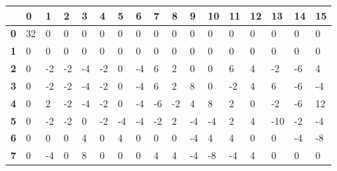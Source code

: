 \begin{longtable}[c]{|l|l|l|l|l|l|l|l|l|l|l|l|l|l|l|l|l|}
\hline
            & \textbf{0} & \textbf{1} & \textbf{2} & \textbf{3} & \textbf{4} & \textbf{5} & \textbf{6} & \textbf{7} & \textbf{8} & \textbf{9} & \textbf{10} & \textbf{11} & \textbf{12} & \textbf{13} & \textbf{14} & \textbf{15}  \\ \hline
\endfirsthead
%
\endhead
%
\textbf{0}  & 32         & 0          & 0          & 0          & 0          & 0          & 0          & 0          & 0          & 0          & 0           & 0           & 0           & 0           & 0           & 0            \\ \hline
\textbf{1}  & 0          & 0          & 0          & 0          & 0          & 0          & 0          & 0          & 0          & 0          & 0           & 0           & 0           & 0           & 0           & 0            \\ \hline
\textbf{2}  & 0          & -2         & -2         & -4         & -2         & 0          & -4         & 6          & 2          & 0          & 0           & 6           & 4           & -2          & -6          & 4            \\ \hline
\textbf{3}  & 0          & -2         & -2         & -4         & -2         & 0          & -4         & 6          & 2          & 8          & 0           & -2          & 4           & 6           & -6          & -4           \\ \hline
\textbf{4}  & 0          & 2          & -2         & -4         & -2         & 0          & -4         & -6         & -2         & 4          & 8           & 2           & 0           & -2          & -6          & 12           \\ \hline
\textbf{5}  & 0          & -2         & -2         & 0          & -2         & -4         & -4         & -2         & 2          & -4         & -4          & 2           & 4           & -10         & -2          & -4           \\ \hline
\textbf{6}  & 0          & 0          & 0          & 4          & 0          & 4          & 0          & 0          & 0          & -4         & 4           & 4           & 0           & 0           & -4          & -8           \\ \hline
\textbf{7}  & 0          & -4         & 0          & 8          & 0          & 0          & 0          & 4          & 4          & -4         & -8          & -4          & 4           & 0           & 0           & 0            \\ \hline

\end{longtable}
